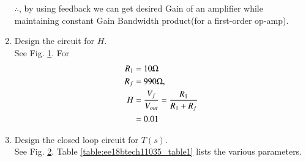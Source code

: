 \begin{enumerate}[label=\arabic*.,ref=\theenumi]
$\therefore$, by using feedback we can get desired Gain of an amplifier while maintaining constant Gain Bandwidth product(for a first-order op-amp).


\item Design the circuit for $H$.
\\
\solution See Fig. \ref{fig:ee18btech11035_feedback}.
For 
\begin{align}
R_{1} &= 10\ohm
\\
R_{f} &= 990\ohm, 
\\
  H &=   \frac{V_{f}}{V_{out}}=\frac{R_{1}}{R_{1}+R_{f}}
\\
&=0.01
\end{align}


\begin{figure}[!ht]
    \begin{center}
		\resizebox{\columnwidth}{!}{}
	\end{center}
\caption{}
\label{fig:ee18btech11035_feedback}
\end{figure}

\item Design the closed loop circuit for $T(s)$.
\\
\solution See Fig. \ref{fig:ee18btech11035_circuit}.  Table \ref{table:ee18btech11035_table1}
lists the various parameters.
%
\begin{figure}[!ht]
    \begin{center}
		\resizebox{\columnwidth}{!}{}
	\end{center}
\caption{}
\label{fig:ee18btech11035_circuit}
\end{figure}


\begin{table}[!ht]
\centering

\caption{}
\label{table:ee18btech11035_table1}
\end{table}


%
%


\end{enumerate}
